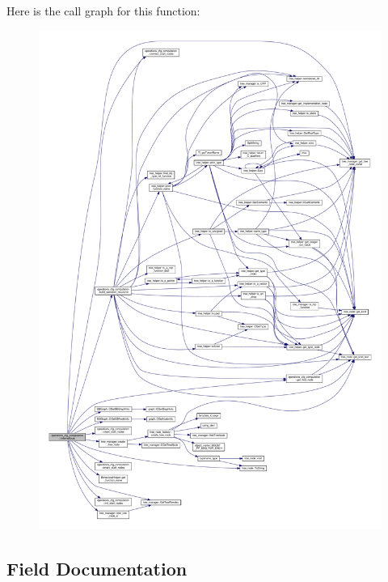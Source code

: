 Here is the call graph for this function\+:
\nopagebreak
\begin{figure}[H]
\begin{center}
\leavevmode
\includegraphics[width=350pt]{d0/d11/classoperations__cfg__computation_a5ab48f4fbba150d484e99c36c352bfad_cgraph}
\end{center}
\end{figure}


\subsection{Field Documentation}
\mbox{\label{classoperations__cfg__computation_ab7ad207edecdf0376496f570bd70638b}} 
